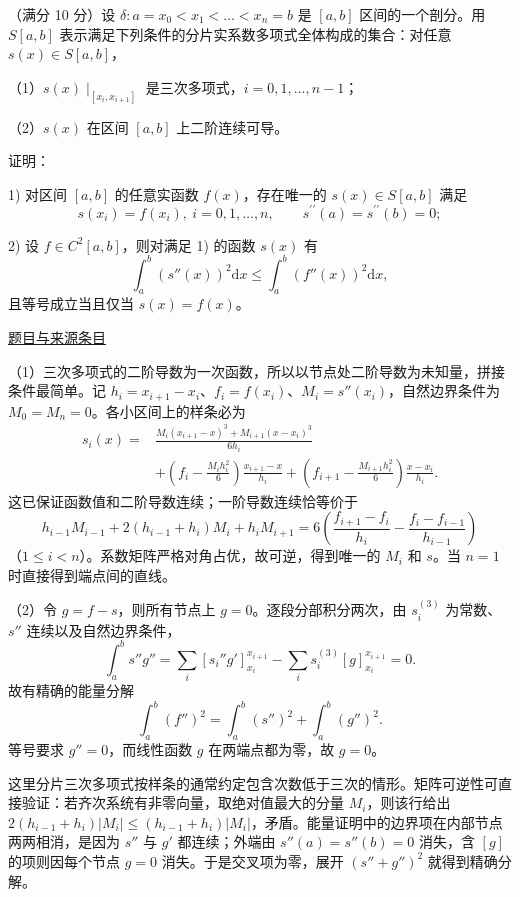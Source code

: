 \documentclass[UTF8,12pt,a4paper,fontset=fandol]{ctexart}
\begin{document}
\begin{example}\label{ex:fin10-hi:11}\label{pr:fin10-hi:11}

（满分 10 分）设 $\delta: a = x_0 < x_1 < \dots < x_n = b$ 是 $[a, b]$ 区间的一个剖分。用 $S[a, b]$ 表示满足下列条件的分片实系数多项式全体构成的集合：对任意 $s(x) \in S[a, b]$，

（1）$s(x) \mid_{[x_i, x_{i+1}]}$ 是三次多项式，$i = 0, 1, \dots, n-1$；

（2）$s(x)$ 在区间 $[a, b]$ 上二阶连续可导。

证明：

1) 对区间 $[a,b]$ 的任意实函数 $f(x)$，存在唯一的 $s(x)\in S[a,b]$ 满足
\[
s\left(x_{i}\right)=f\left(x_{i}\right),\ i=0,1,\dots,n, \qquad s^{\prime\prime}(a)=s^{\prime\prime}(b)=0;
\]

2) 设 $f\in C^{2}[a,b]$，则对满足 1) 的函数 $s(x)$ 有
\[
\int_{a}^{b}\left(s''(x)\right)^{2}\mathrm{d}x\leq \int_{a}^{b}\left(f''(x)\right)^{2}\mathrm{d}x,
\]
且等号成立当且仅当 $s(x)=f(x)$。

\par\href{https://github.com/lzxcr/cmc-mathematics/blob/64916fa1fdbc3e444a652eca204d5669058ee321/src/problems/finals/10/13.md}{题目与来源条目}

\end{example}

\begin{solve}\label{ans:fin10-hi:11}

（1）三次多项式的二阶导数为一次函数，所以以节点处二阶导数为未知量，拼接条件最简单。记 $h_i=x_{i+1}-x_i$、$f_i=f(x_i)$、$M_i=s''(x_i)$，自然边界条件为 $M_0=M_n=0$。各小区间上的样条必为
\[
\begin{aligned}
s_i(x)={}&\frac{M_i(x_{i+1}-x)^3+M_{i+1}(x-x_i)^3}{6h_i}\\
&+\left(f_i-\frac{M_ih_i^2}{6}\right)\frac{x_{i+1}-x}{h_i}
+\left(f_{i+1}-\frac{M_{i+1}h_i^2}{6}\right)\frac{x-x_i}{h_i}.
\end{aligned}
\]
这已保证函数值和二阶导数连续；一阶导数连续恰等价于
\[
h_{i-1}M_{i-1}+2(h_{i-1}+h_i)M_i+h_iM_{i+1}
=6\left(\frac{f_{i+1}-f_i}{h_i}-\frac{f_i-f_{i-1}}{h_{i-1}}\right)
\]
（$1\leq i<n$）。系数矩阵严格对角占优，故可逆，得到唯一的 $M_i$ 和 $s$。当 $n=1$ 时直接得到端点间的直线。

（2）令 $g=f-s$，则所有节点上 $g=0$。逐段分部积分两次，由 $s_i^{(3)}$ 为常数、$s''$ 连续以及自然边界条件，
\[
\int_a^bs''g''=\sum_i[s_i''g']_{x_i}^{x_{i+1}}
-\sum_i s_i^{(3)}[g]_{x_i}^{x_{i+1}}=0.
\]
故有精确的能量分解
\[
\int_a^b(f'')^2=\int_a^b(s'')^2+\int_a^b(g'')^2.
\]
等号要求 $g''=0$，而线性函数 $g$ 在两端点都为零，故 $g=0$。

这里分片三次多项式按样条的通常约定包含次数低于三次的情形。矩阵可逆性可直接验证：若齐次系统有非零向量，取绝对值最大的分量 $M_i$，则该行给出 $2(h_{i-1}+h_i)|M_i|\le(h_{i-1}+h_i)|M_i|$，矛盾。能量证明中的边界项在内部节点两两相消，是因为 $s''$ 与 $g'$ 都连续；外端由 $s''(a)=s''(b)=0$ 消失，含 $[g]$ 的项则因每个节点 $g=0$ 消失。于是交叉项为零，展开 $(s''+g'')^2$ 就得到精确分解。

\end{solve}
\end{document}
